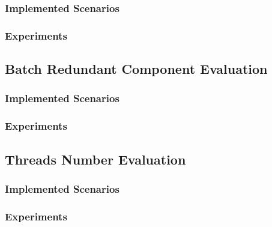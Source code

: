\documentclass[10pt,a4paper]{article}
\begin{document}
\subsubsection{Implemented Scenarios} 
\subsubsection{Experiments} 

\subsection{Batch Redundant Component Evaluation}
\subsubsection{Implemented Scenarios} 
\subsubsection{Experiments} 

\subsection{Threads Number Evaluation}
\subsubsection{Implemented Scenarios} 
\subsubsection{Experiments} 

\pagebreak
\end{document}
